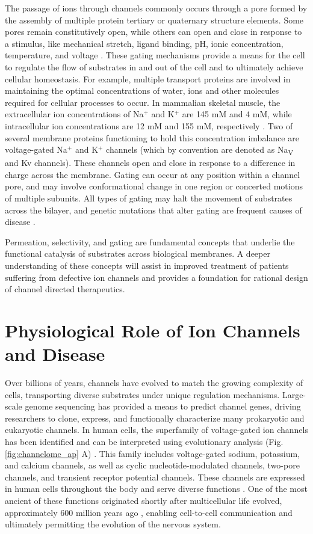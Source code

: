 \begin{refsection}
The passage of ions through channels commonly occurs through a pore formed by the assembly of multiple protein tertiary or quaternary structure elements. Some pores remain constitutively open, while others can open and close in response to a stimulus, like mechanical stretch, ligand binding, pH, ionic concentration, temperature, and voltage \cite{Zheng:2015vj}. These gating mechanisms provide a means for the cell to regulate the flow of substrates in and out of the cell and to ultimately achieve cellular homeostasis. For example, multiple transport proteins are involved in maintaining the optimal concentrations of water, ions and other molecules required for cellular processes to occur. In mammalian skeletal muscle, the extracellular ion concentrations of Na$^+$ and K$^+$ are 145 mM and 4 mM, while intracellular ion concentrations are 12 mM and 155 mM, respectively \cite{Hille:2001tw}. Two of several membrane proteins functioning to hold this concentration imbalance are voltage-gated Na$^+$ and K$^+$ channels (which by convention are denoted as Na\textsubscript{V} and Kv channels). These channels open and close in response to a difference in charge across the membrane. Gating can occur at any position within a channel pore, and may involve conformational change in one region or concerted motions of multiple subunits. All types of gating may halt the movement of substrates across the bilayer, and genetic mutations that alter gating are frequent causes of disease \cite{Ashcroft:2000ts}.

Permeation, selectivity, and gating are fundamental concepts that underlie the functional catalysis of substrates across biological membranes. A deeper understanding of these concepts will assist in improved treatment of patients suffering from defective ion channels and provides a foundation for rational design of channel directed therapeutics.

\section{Physiological Role of Ion Channels and Disease}

Over billions of years, channels have evolved to match the growing complexity of cells, transporting diverse substrates under unique regulation mechanisms. Large-scale genome sequencing has provided a means to predict channel genes, driving researchers to clone, express, and functionally characterize many prokaryotic and eukaryotic channels. In human cells, the superfamily of voltage-gated ion channels has been identified and can be interpreted using evolutionary analysis (Fig. \ref{fig:channelome_ap} A) \cite{Yu:2004ep}. This family includes voltage-gated sodium, potassium, and calcium channels, as well as cyclic nucleotide-modulated channels, two-pore channels, and transient receptor potential channels. These channels are expressed in human cells throughout the body and serve diverse functions \cite{Zheng:2015vj,Hille:2001tw}. One of the most ancient of these functions originated shortly after multicellular life evolved, approximately 600 million years ago \cite{Chen:2014du}, enabling cell-to-cell communication and ultimately permitting the evolution of the nervous system.


\end{refsection}
